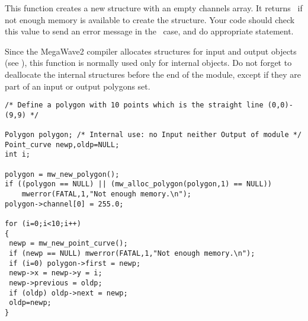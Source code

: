 \Description
This function creates a new \polygon structure with an empty channels array.
It returns \Null\ if not enough memory is available to create the structure.
Your code should check this value to send an
error message in the \Null\ case, and do appropriate statement.

Since the MegaWave2 compiler allocates structures for input and output 
objects (see \volI), this function is normally used only for internal objects.
Do not forget to deallocate the internal structures before the end
of the module, except if they are part of an input or output polygons set.

\Next
\Example
\begin{verbatim}
/* Define a polygon with 10 points which is the straight line (0,0)-(9,9) */

Polygon polygon; /* Internal use: no Input neither Output of module */
Point_curve newp,oldp=NULL;
int i;

polygon = mw_new_polygon();
if ((polygon == NULL) || (mw_alloc_polygon(polygon,1) == NULL))
    mwerror(FATAL,1,"Not enough memory.\n");
polygon->channel[0] = 255.0;

for (i=0;i<10;i++)
{
 newp = mw_new_point_curve();
 if (newp == NULL) mwerror(FATAL,1,"Not enough memory.\n");
 if (i=0) polygon->first = newp;
 newp->x = newp->y = i;
 newp->previous = oldp;
 if (oldp) oldp->next = newp;
 oldp=newp;
} 
\end{verbatim}
\newpage %

